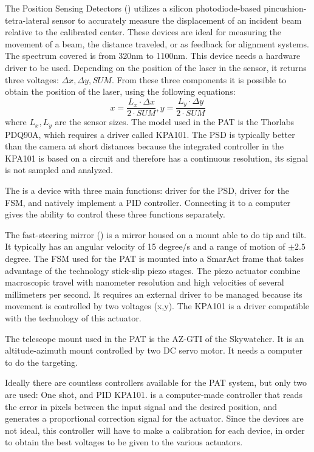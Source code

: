 The Position Sensing Detectors () utilizes a silicon photodiode-based pincushion-tetra-lateral sensor to accurately measure the displacement of an incident beam relative to the calibrated center. These devices are ideal for measuring the movement of a beam, the distance traveled, or as feedback for alignment systems.
The spectrum covered is from 320nm to 1100nm. This device needs a hardware driver to be used. Depending on the position of the laser in the sensor, it returns three voltages: $\Delta x, \Delta y, SUM$.
From these three components it is possible to obtain the position of the laser, using the following equations:
$$x = \frac{L_x \cdot \Delta x}{2 \cdot SUM}, y = \frac{L_y \cdot \Delta y}{2 \cdot  SUM}$$
where $L_x,L_y$ are the sensor sizes. The model used in the PAT is the Thorlabs PDQ90A, which requires a driver called KPA101.
The PSD is typically better than the camera at short distances because the integrated controller in the KPA101 is based on a circuit and therefore has a continuous resolution, its signal is not sampled and analyzed.

The  is a device with three main functions: driver for the PSD, driver for the FSM, and natively implement a PID controller. Connecting it to a computer gives the ability to control these three functions separately.


The fast-steering mirror () is a mirror housed on a mount able to do tip and tilt. It typically has an angular velocity of 15 degree/s and a range of motion of $\pm 2.5$ degree.
The FSM used for the PAT is mounted into a SmarAct frame that takes advantage of the technology stick-slip piezo stages. The piezo actuator combine macroscopic travel with nanometer resolution and high velocities of several millimeters per second.
It requires an external driver to be managed because its movement is controlled by two voltages (x,y). The KPA101 is a driver compatible with the technology of this actuator.

The telescope mount used in the PAT is the AZ-GTI of the Skywatcher. It is an altitude-azimuth mount controlled by two DC servo motor. It needs a computer to do the targeting.

Ideally there are countless controllers available for the PAT system, but only two are used: One shot, and PID KPA101.
 is a computer-made controller that reads the error in pixels between the input signal and the desired position, and generates a proportional correction signal for the actuator.
Since the devices are not ideal, this controller will have to make a calibration for each device, in order to obtain the best voltages to be given to the various actuators.

